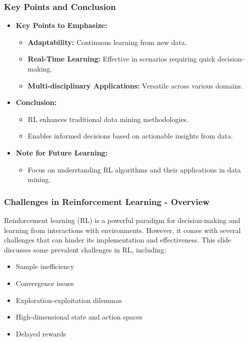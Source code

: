 \documentclass[aspectratio=169]{beamer}
\begin{document}
\begin{frame}[fragile]
    \frametitle{Key Points and Conclusion}
    \begin{itemize}
        \item \textbf{Key Points to Emphasize:}
        \begin{itemize}
            \item \textbf{Adaptability:} Continuous learning from new data.
            \item \textbf{Real-Time Learning:} Effective in scenarios requiring quick decision-making.
            \item \textbf{Multi-disciplinary Applications:} Versatile across various domains.
        \end{itemize}
        \item \textbf{Conclusion:}
        \begin{itemize}
            \item RL enhances traditional data mining methodologies.
            \item Enables informed decisions based on actionable insights from data.
        \end{itemize}
        \item \textbf{Note for Future Learning:}
        \begin{itemize}
            \item Focus on understanding RL algorithms and their applications in data mining.
        \end{itemize}
    \end{itemize}
\end{frame}

\begin{frame}[fragile]
    \frametitle{Challenges in Reinforcement Learning - Overview}
    Reinforcement learning (RL) is a powerful paradigm for decision-making and learning from interactions with environments. 
    However, it comes with several challenges that can hinder its implementation and effectiveness. This slide discusses some prevalent challenges in RL, including:
    \begin{itemize}
        \item Sample inefficiency
        \item Convergence issues
        \item Exploration-exploitation dilemmas
        \item High-dimensional state and action spaces
        \item Delayed rewards
    \end{itemize}
\end{frame}
\end{document}

